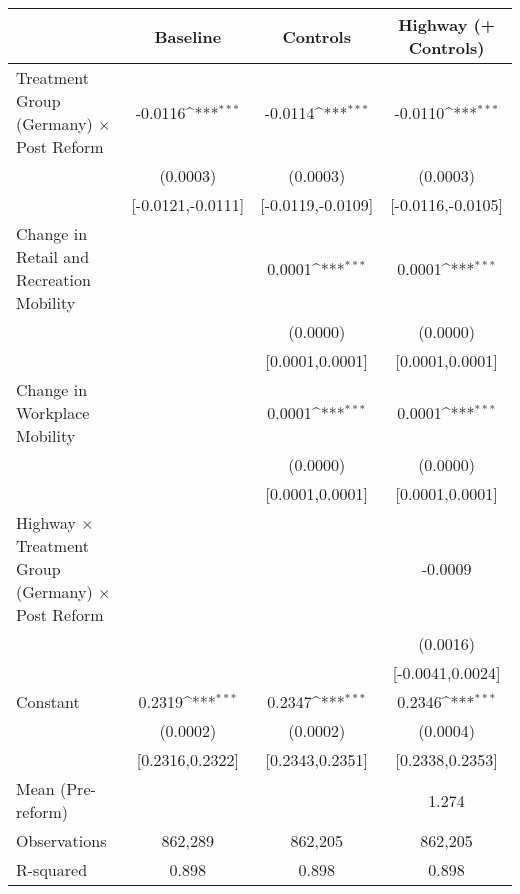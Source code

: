 {
\def\sym#1{\ifmmode^{#1}\else\(^{#1}\)\fi}
\begin{tabular}{l*{3}{c}}
\toprule
                    &\multicolumn{1}{c}{Baseline}&\multicolumn{1}{c}{Controls}&\multicolumn{1}{c}{Highway (+ Controls)}\\
\midrule
Treatment Group (Germany) $\times$ Post Reform&     -0.0116\sym{***}&     -0.0114\sym{***}&     -0.0110\sym{***}\\
                    &    (0.0003)         &    (0.0003)         &    (0.0003)         \\
                    &[-0.0121,-0.0111]         &[-0.0119,-0.0109]         &[-0.0116,-0.0105]         \\
Change in Retail and Recreation Mobility&                     &      0.0001\sym{***}&      0.0001\sym{***}\\
                    &                     &    (0.0000)         &    (0.0000)         \\
                    &                     &[0.0001,0.0001]         &[0.0001,0.0001]         \\
Change in Workplace Mobility&                     &      0.0001\sym{***}&      0.0001\sym{***}\\
                    &                     &    (0.0000)         &    (0.0000)         \\
                    &                     &[0.0001,0.0001]         &[0.0001,0.0001]         \\
Highway $\times$ Treatment Group (Germany) $\times$ Post Reform&                     &                     &     -0.0009         \\
                    &                     &                     &    (0.0016)         \\
                    &                     &                     &[-0.0041,0.0024]         \\
Constant            &      0.2319\sym{***}&      0.2347\sym{***}&      0.2346\sym{***}\\
                    &    (0.0002)         &    (0.0002)         &    (0.0004)         \\
                    &[0.2316,0.2322]         &[0.2343,0.2351]         &[0.2338,0.2353]         \\
\midrule
Mean (Pre-reform)   &                     &                     &       1.274         \\
Observations        &     862,289         &     862,205         &     862,205         \\
R-squared           &       0.898         &       0.898         &       0.898         \\
\bottomrule
\end{tabular}
}
